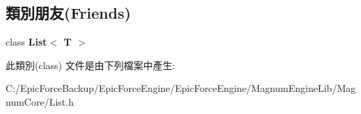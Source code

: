\subsection*{類別朋友(Friends)}
\begin{DoxyCompactItemize}
\item 
class {\bfseries List$<$ T $>$}\hypertarget{class_magnum_1_1_link_adfa51a0eca1eba953f68ca3f65cdaa05}{}\label{class_magnum_1_1_link_adfa51a0eca1eba953f68ca3f65cdaa05}

\end{DoxyCompactItemize}


此類別(class) 文件是由下列檔案中產生\+:\begin{DoxyCompactItemize}
\item 
C\+:/\+Epic\+Force\+Backup/\+Epic\+Force\+Engine/\+Epic\+Force\+Engine/\+Magnum\+Engine\+Lib/\+Magnum\+Core/List.\+h\end{DoxyCompactItemize}
